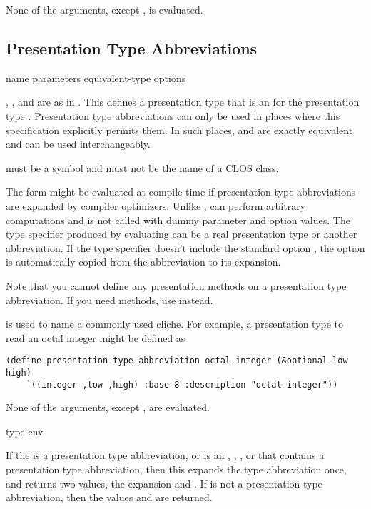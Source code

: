 None of the arguments, except , is evaluated.


\subsection {Presentation Type Abbreviations}

 {name parameters equivalent-type
                                                   \key options}

, , and  are as in
.  This defines a presentation type that is an
 for the presentation type .
Presentation type abbreviations can only be used in places where this
specification explicitly permits them.  In such places, 
and  are exactly equivalent and can be used interchangeably.

 must be a symbol and must not be the name of a CLOS class.

The  form might be evaluated at compile time if
presentation type abbreviations are expanded by compiler optimizers.  Unlike
,  can perform arbitrary computations and
is not called with dummy parameter and option values.  The type specifier
produced by evaluating  can be a real presentation type or
another abbreviation.  If the type specifier doesn't include the standard option
, the option is automatically copied from the abbreviation to
its expansion.

Note that you cannot define any presentation methods on a presentation type
abbreviation.  If you need methods, use  instead.

 is used to name a commonly used
cliche.  For example, a presentation type to read an octal integer might be
defined as
\begin{verbatim}
(define-presentation-type-abbreviation octal-integer (&optional low high)
    `((integer ,low ,high) :base 8 :description "octal integer"))
\end{verbatim}

None of the arguments, except , are evaluated.


 {type \optional env}

If the   is a presentation type
abbreviation, or is an , , , or
 that contains a presentation type abbreviation, then
this expands the type abbreviation once, and returns two values, the expansion
and .  If  is not a presentation type abbreviation, then the
values  and  are returned.

